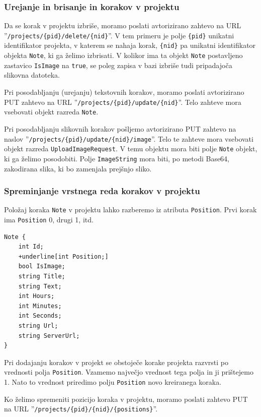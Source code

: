 \documentclass[a4paper, 12pt]{book}
\begin{document}
\subsubsection{Urejanje in brisanje in korakov v projektu}

Da se korak v projektu izbriše, moramo poslati avtorizirano zahtevo na URL ''\texttt{/projects/\{pid\}/delete/\{nid\}}''.
V tem primeru je polje \texttt{\{pid\}} unikatni identifikator projekta, v katerem se nahaja korak, \texttt{\{nid\}} pa unikatni identifikator objekta \texttt{Note}, ki ga želimo izbrisati.
V kolikor ima ta objekt \texttt{Note} postavljeno zastavico \texttt{IsImage} na \texttt{true}, se poleg zapisa v bazi izbriše tudi pripadajoča slikovna datoteka.

Pri posodabljanju (urejanju) tekstovnih korakov, moramo poslati avtorizirano PUT zahtevo na URL ''\texttt{/projects/\{pid\}/update/\{nid\}}''.
Telo zahteve mora vsebovati objekt razreda \texttt{Note}.

Pri posodabljanju slikovnih korakov pošljemo avtorizirano PUT zahtevo na naslov ''\texttt{/projects/\{pid\}/update/\{nid\}/image}''.
Telo te zahteve mora vsebovati objekt razreda \texttt{UploadImageRequest}.
V temu objektu mora biti polje \texttt{Note} objekt, ki ga želimo posodobiti.
Polje \texttt{ImageString} mora biti, po metodi Base64, zakodirana slika, ki bo zamenjala prejšnjo sliko.

\subsubsection{Spreminjanje vrstnega reda korakov v projektu}

Položaj koraka \texttt{Note} v projektu lahko razberemo iz atributa \texttt{Position}.
Prvi korak ima \texttt{Position} 0, drugi 1, itd.

\begin{Verbatim}[commandchars=+\[\]]
Note { 
    int Id; 
    +underline[int Position;]
    bool IsImage;  
    string Title; 
    string Text;
    int Hours; 
    int Minutes;
    int Seconds;
    string Url;
    string ServerUrl;
}
\end{Verbatim}

Pri dodajanju korakov v projekt se obstoječe korake projekta razvrsti po vrednosti polja \texttt{Position}.
Vzamemo največjo vrednost tega polja in ji prištejemo 1.
Nato to vrednost priredimo polju \texttt{Position} novo kreiranega koraka.

Ko želimo spremeniti pozicijo koraka v projektu, moramo poslati zahtevo PUT na URL ''\texttt{/projects/\{pid\}/\{nid\}/\{positions\}}''.
\end{document}
